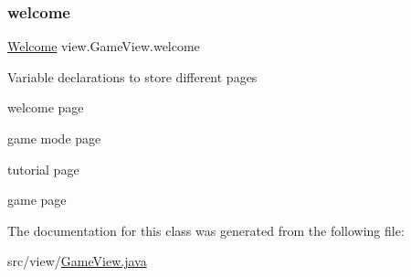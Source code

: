 \hypertarget{classview_1_1_game_view_a473510516d38bd1b016321b06962f0b0}{}\label{classview_1_1_game_view_a473510516d38bd1b016321b06962f0b0} 
\subsubsection{\texorpdfstring{welcome}{welcome}}
{\footnotesize\ttfamily \hyperlink{classview_1_1_welcome}{Welcome} view.\+Game\+View.\+welcome\hspace{0.3cm}{\ttfamily [private]}}

Variable declarations to store different pages
\begin{DoxyItemize}
\item welcome page
\item game mode page
\item tutorial page
\item game page 
\end{DoxyItemize}

The documentation for this class was generated from the following file\+:\begin{DoxyCompactItemize}
\item 
src/view/\hyperlink{_game_view_8java}{Game\+View.\+java}\end{DoxyCompactItemize}
